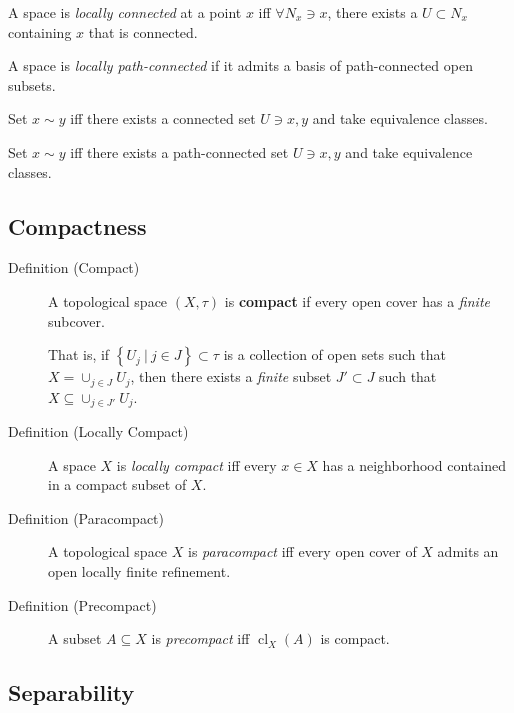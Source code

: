 \begin{description}
\tightlist
\item[Definition (Locally Connected)]
A space is \emph{locally connected} at a point \(x\) iff
\(\forall N_x \ni x\), there exists a \(U\subset N_x\) containing \(x\)
that is connected.
\item[Definition (Locally Path-Connected)]
A space is \emph{locally path-connected} if it admits a basis of
path-connected open subsets.
\item[Definition (Components)]
Set \(x\sim y\) iff there exists a connected set \(U\ni x, y\) and take
equivalence classes.
\item[Definition (Path Components)]
Set \(x\sim y\) iff there exists a path-connected set \(U\ni x, y\) and
take equivalence classes.
\end{description}

\hypertarget{compactness}{%
\subsection{Compactness}\label{compactness}}

\begin{description}
\item[Definition (Compact)]
A topological space \((X, \tau)\) is \textbf{compact} if every open
cover has a \emph{finite} subcover.

That is, if
\(\left\{{U_j {~\mathrel{\Big|}~}j\in J}\right\} \subset \tau\) is a
collection of open sets such that \(X = \cup_{j\in J} U_j\), then there
exists a \emph{finite} subset \(J' \subset J\) such that
\(X \subseteq \cup_{j\in J'} U_j\).
\item[Definition (Locally Compact)]
A space \(X\) is \emph{locally compact} iff every \(x\in X\) has a
neighborhood contained in a compact subset of \(X\).
\item[Definition (Paracompact)]
A topological space \(X\) is \emph{paracompact} iff every open cover of
\(X\) admits an open locally finite refinement.
\item[Definition (Precompact)]
A subset \(A\subseteq X\) is \emph{precompact} iff
\(\operatorname{cl}_X(A)\) is compact.
\end{description}

\hypertarget{separability}{%
\subsection{Separability}\label{separability}}

